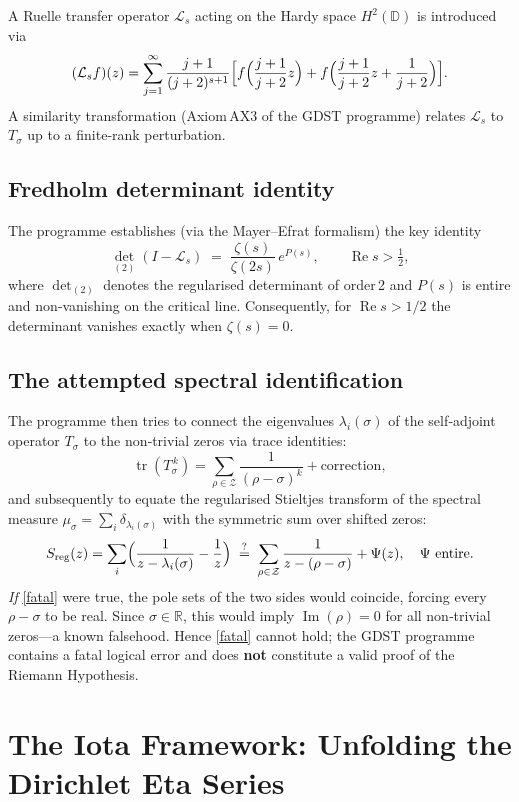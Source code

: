 \documentclass[11pt,a4paper]{article}
\newcommand{\R}{\mathbb{R}}
\newcommand{\tr}{\operatorname{tr}}
\newcommand{\RE}{\operatorname{Re}}
\newcommand{\IM}{\operatorname{Im}}
\begin{document}
A Ruelle transfer operator \(\mathcal{L}_s\) acting on the Hardy space \(H^2(\mathbb{D})\) is introduced via
\[
(\mathcal{L}_s f)(z)=\sum_{j=1}^\infty \frac{j+1}{(j+2)^{s+1}}
\Bigl[ f\Bigl(\frac{j+1}{j+2}z\Bigr) + f\Bigl(\frac{j+1}{j+2}z+\frac1{j+2}\Bigr) \Bigr].
\]
A similarity transformation (Axiom AX3 of the GDST programme) relates \(\mathcal{L}_s\) to \(T_\sigma\) up to a finite‑rank perturbation.

\subsection{Fredholm determinant identity}
The programme establishes (via the Mayer–Efrat formalism) the key identity
\begin{equation}\label{detid}
\det_{(2)}(I-\mathcal{L}_s) \;=\; \frac{\zeta(s)}{\zeta(2s)}\,e^{P(s)},\qquad \RE s>\tfrac12,
\end{equation}
where \(\det_{(2)}\) denotes the regularised determinant of order 2 and \(P(s)\) is entire and non‑vanishing on the critical line.  Consequently, for \(\RE s>1/2\) the determinant vanishes exactly when \(\zeta(s)=0\).

\subsection{The attempted spectral identification}
The programme then tries to connect the eigenvalues \(\lambda_i(\sigma)\) of the self‑adjoint operator \(T_\sigma\) to the non‑trivial zeros via trace identities:
\[
\tr(T_\sigma^{\,k}) = \sum_{\rho\in\mathcal Z}\frac1{(\rho-\sigma)^k} + \text{correction},
\]
and subsequently to equate the regularised Stieltjes transform of the spectral measure \(\mu_\sigma=\sum_i\delta_{\lambda_i(\sigma)}\) with the symmetric sum over shifted zeros:
\begin{equation}\label{fatal}
S_{\mathrm{reg}}(z)=\sum_i\Bigl(\frac1{z-\lambda_i(\sigma)}-\frac1z\Bigr)
\;\stackrel{?}{=}\; \sum_{\rho\in\mathcal Z}\frac{1}{z-(\rho-\sigma)} + \Psi(z),\quad \Psi\text{ entire}.
\end{equation}
\emph{If} \eqref{fatal} were true, the pole sets of the two sides would coincide, forcing every \(\rho-\sigma\) to be real.  Since \(\sigma\in\R\), this would imply \(\IM(\rho)=0\) for all non‑trivial zeros—a known falsehood.  Hence \eqref{fatal} cannot hold; the GDST programme contains a fatal logical error and does \textbf{not} constitute a valid proof of the Riemann Hypothesis.

\section{The Iota Framework: Unfolding the Dirichlet Eta Series}
\label{sec:iota}
\end{document}
